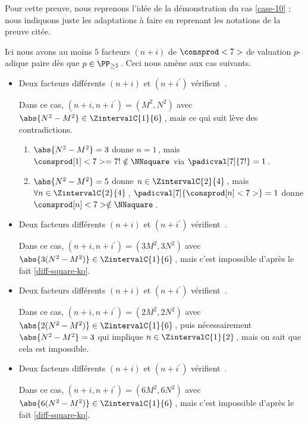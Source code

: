 Pour cette preuve, nous reprenons l'idée de la démonstration du cas \ref{case-10} ; nous indiquons juste les adaptations à faire en reprenant les notations de la preuve citée.

\smallskip

Ici nous avons au moins $5$ facteurs $(n + i)$ de $\consprod<7>$ de valuation $p$-adique paire dès que $p \in \PP_{\geq 5}$\,.
Ceci nous amène aux cas suivants.
%
\begin{itemize}
	\medskip
	\item Deux facteurs différents $(n+i)$ et $(n+i^\prime)$ vérifient \,.
		
	\smallskip
	\noindent
	Dans ce cas, $(n+i, n+i^\prime) = (M^2, N^2)$ avec $\abs{N^2 - M^2} \in \ZintervalC{1}{6}$\,, mais ce qui suit lève des contradictions.
	\begin{enumerate}
		\item $\abs{N^2 - M^2} = 3$ donne $n = 1$\,, mais $\consprod[1]<7> = 7! \notin \NNsquare$ via $\padicval[7]{7!} = 1$\,.


		\item $\abs{N^2 - M^2} = 5$ donne $n \in \ZintervalC{2}{4}$\,, mais $\forall n \in \ZintervalC{2}{4}$\,, $\padicval[7]{\consprod[n]<7>} = 1$ donne $\consprod[n]<7> \notin \NNsquare$\,.
	\end{enumerate}


	\medskip
	\item Deux facteurs différents $(n+i)$ et $(n+i^\prime)$ vérifient \,.
		
	\smallskip
	\noindent
	Dans ce cas, $(n+i, n+i^\prime) = (3 M^2, 3 N^2)$ avec $\abs{3(N^2 - M^2)} \in \ZintervalC{1}{6}$\,, mais c'est impossible d'après le fait \ref{diff-square-ko}.

	\medskip
	\item Deux facteurs différents $(n+i)$ et $(n+i^\prime)$ vérifient \,.
		
	\smallskip
	\noindent
	Dans ce cas, $(n+i, n+i^\prime) = (2 M^2, 2 N^2)$ avec $\abs{2(N^2 - M^2)} \in \ZintervalC{1}{6}$\,, puis nécessairement $\abs{N^2 - M^2} = 3$ qui implique $n \in \ZintervalC{1}{2}$\,, mais on sait que cela est impossible.


	\medskip
	\item Deux facteurs différents $(n+i)$ et $(n+i^\prime)$ vérifient \,.
		
	\smallskip
	\noindent
	Dans ce cas, $(n+i, n+i^\prime) = (6 M^2, 6 N^2)$ avec $\abs{6(N^2 - M^2)} \in \ZintervalC{1}{6}$\,, mais c'est impossible d'après le fait \ref{diff-square-ko}.
	\qedhere
\end{itemize}